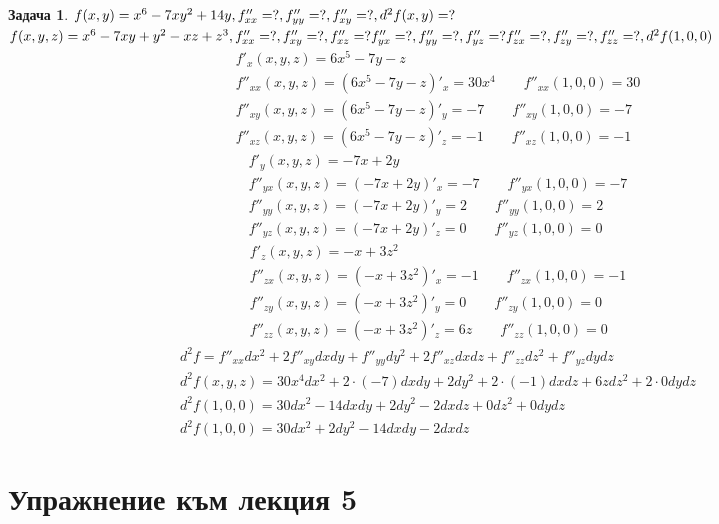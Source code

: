 \documentclass[a4paper,fleqn,12pt]{article}
\theoremstyle{definition}
\newtheorem{task}{Задача}[subsection]
\begin{document}
\begin{task}
$f(x,y) = x^6 - 7xy^2 + 14y,\\
f''_{xx} = ?, f''_{yy} = ?, f''_{xy} = ?, d^2f(x,y) = ?$\\
$f(x,y,z) = x^6 - 7xy +y^2 - xz + z^3 ,  \\
f''_{xx} = ?, f''_{xy} = ?, f''_{xz} = ?  f''_{yx} = ?, f''_{yy} = ?, f''_{yz} = ?  f''_{zx} = ?, f''_{zy} = ?, f''_{zz} = ?, d^2f(1,0,0)$
\begin{gather*}
f'_x(x,y,z) = 6x^5 - 7y - z\\
f''_{xx}(x,y,z) = (6x^5 - 7y - z)'_x = 30x^4 \qquad f''_{xx}(1,0,0) = 30 \\
f''_{xy}(x,y,z) = (6x^5 - 7y - z)'_y = -7 \qquad f''_{xy}(1,0,0) = -7 \\
f''_{xz}(x,y,z) = (6x^5 - 7y - z)'_z = -1 \qquad f''_{xz}(1,0,0) = -1 
\end{gather*}
\begin{gather*}
f'_y(x,y,z) = -7x + 2y\\
f''_{yx}(x,y,z) = (-7x + 2y)'_x = -7 \qquad f''_{yx}(1,0,0) = -7 \\
f''_{yy}(x,y,z) = (-7x + 2y)'_y = 2 \qquad f''_{yy}(1,0,0) = 2 \\
f''_{yz}(x,y,z) = (-7x + 2y)'_z = 0\qquad f''_{yz}(1,0,0) = 0 
\end{gather*}
\begin{gather*}
f'_z(x,y,z) = -x + 3z^2\\
f''_{zx}(x,y,z) = (-x + 3z^2)'_x = -1 \qquad f''_{zx}(1,0,0) = -1 \\
f''_{zy}(x,y,z) = (-x + 3z^2)'_y = 0 \qquad f''_{zy}(1,0,0) = 0 \\
 f''_{zz}(x,y,z) = (-x + 3z^2)'_z = 6z  \qquad f''_{zz}(1,0,0) = 0 
\end{gather*}
\begin{gather*}
d^2f = f''_{xx}dx^2 + 2f''_{xy}dxdy + f''_{yy}dy^2 + 2f''_{xz}dxdz +  f''_{zz}dz^2 + f''_{yz}dydz\\
d^2f(x,y,z) = 30x^4dx^2 +2\cdot(-7) dxdy + 2dy^2 + 2\cdot(-1)dxdz + 6zdz^2 + 2\cdot 0 dydz \\
d^2f(1,0,0) = 30dx^2 -14dxdy + 2dy^2 - 2dxdz + 0dz^2 + 0 dydz \\
d^2f(1,0,0) = 30dx^2 + 2dy^2 -14dxdy - 2dxdz 
\end{gather*}

\end{task}
\newpage
\section{Упражнение към лекция 5}
\end{document}
